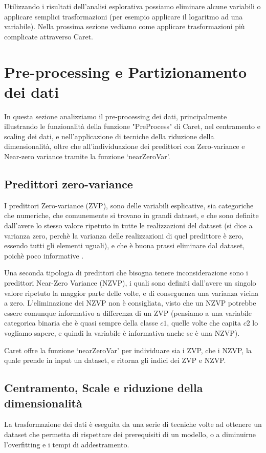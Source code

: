 \documentclass[12pt]{article}
\begin{document}
Utilizzando i risultati dell'analisi esplorativa possiamo eliminare alcune variabili o applicare semplici trasformazioni (per esempio applicare il logaritmo ad una variabile). Nella prossima sezione vediamo come 
applicare trasformazioni più complicate attraverso Caret.

\section{Pre-processing e Partizionamento dei dati}
\label{sec:preprocessing}
In questa sezione analizziamo il pre-processing dei dati, principalmente illustrando le funzionalità della funzione "PreProcess" di Caret, nel centramento e scaling dei dati, e nell'applicazione di tecniche della riduzione della dimensionalità, oltre che  
all'individuazione dei predittori con Zero-variance e Near-zero variance tramite la funzione ‘nearZeroVar’.

\subsection{Predittori zero-variance}
I predittori Zero-variance (ZVP), sono delle variabili esplicative, sia categoriche che numeriche, che comunemente si trovano in grandi dataset, e che sono definite dall'avere lo stesso valore ripetuto in tutte le realizzazioni del dataset 
(si dice a varianza zero, perchè la varianza delle realizzazioni di quel predittore è zero, essendo tutti gli elementi uguali), e che è buona prassi eliminare dal dataset, poichè poco informative \cite{caret:repo,cit:caretMax,cit:zerovar}.

Una seconda tipologia di predittori che bisogna tenere inconsiderazione sono i predittori Near-Zero Variance (NZVP), i quali sono definiti dall'avere un singolo valore ripetuto la maggior parte delle volte, e di conseguenza una varianza vicina a zero. 
L'eliminazione dei NZVP non è consigliata, visto che un NZVP potrebbe essere comunque informativo a differenza di un ZVP (pensiamo a una variabile categorica binaria che è quasi sempre della classe $c1$, quelle volte che capita $c2$ lo vogliamo sapere, e quindi la variabile è informativa anche se è una NZVP)\cite{cit:zerovar}.

Caret offre la funzione ‘nearZeroVar’ \cite{caret:repo} per individuare sia i ZVP, che i NZVP, la quale prende in input un dataset, e ritorna gli indici dei ZVP e NZVP.
\subsection{Centramento, Scale e riduzione della dimensionalità}
La trasformazione dei dati è eseguita da una serie di tecniche volte ad ottenere un dataset che permetta di rispettare dei prerequisiti di un modello, o a diminuirne l'overfitting e i tempi di addestramento.
\end{document}
